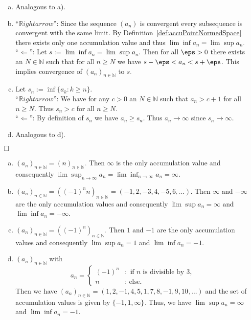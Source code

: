 \begin{enumerate}[a)]
\item Analogous to a).

\item ``$\mathbb{R}ightarrow$'': Since the sequence $(a_{n})$ is convergent every subsequence is convergent with the same limit. By Definition~\ref{def:accuPointNormedSpace} there exists only one accumulation value and thus $\lim\inf a_n=\lim\sup a_n$.\\%
``$\Leftarrow$'': Let $s:=\lim\inf a_n=\lim\sup a_n$. Then for all $\eps>0$ there exists an $N\in\mathbb{N}$ such that for all $n\geq N$ we have $s-\eps<a_{n}<s+\eps$. This implies convergence of $(a_{n})_{n\in\mathbb{N}}$ to $s$.

\item Let $s_{n}:=\inf \{a_{k}:k\geq n\}$.\\
``$\mathbb{R}ightarrow$'': We have for any $c>0$ an $N\in\mathbb{N}$ such that $a_{n}> c+1$ for all $n\geq N$. Thus $s_{n}>c$ for all $n\geq N$.\\
``$\Leftarrow$'': By definition of $s_{n}$ we have $a_{n}\geq s_{n}$. Thus $a_{n}\rightarrow\infty$ since $s_{n}\rightarrow\infty$.

\item Analogous to d).
\end{enumerate}
$\hfill\Box$

\begin{example}
 \begin{enumerate}[(a)]
  \item $(a_n)_{n\in\mathbb{N}}=(n)_{n\in\mathbb{N}}$. Then $\infty$ is the only accumulation value and consequently $\lim\sup_{n \rightarrow \infty} a_n=\lim\inf_{n \rightarrow \infty} a_n=\infty$.
  \item $(a_n)_{n\in\mathbb{N}}=((-1)^nn)_{n\in\mathbb{N}}=(-1,2,-3,4,-5,6,\ldots)$. Then $\infty$ and $-\infty$ are the only accumulation values and consequently $\lim\sup a_n=\infty$ and $\lim\inf a_n=-\infty$.
  \item $(a_n)_{n\in\mathbb{N}}=((-1)^n)_{n\in\mathbb{N}}$. Then $1$ and $-1$ are the only accumulation values and consequently $\lim\sup a_n=1$ and $\lim\inf a_n=-1$.
  \item $(a_n)_{n\in\mathbb{N}}$ with
\[a_n=\begin{cases}(-1)^n&:\text{ if }n\text{ is divisible by }3,\\n&:\text{ else.}\end{cases}\]
Then we have $(a_n)_{n\in\mathbb{N}}=(1,2,-1,4,5,1,7,8,-1,9,10,\ldots)$ and the set of accumulation values is given by $\{-1,1,\infty\}$. Thus, we have $\lim\sup a_n=\infty$ and $\lim\inf a_n=-1$.
 \end{enumerate}
\end{example}

